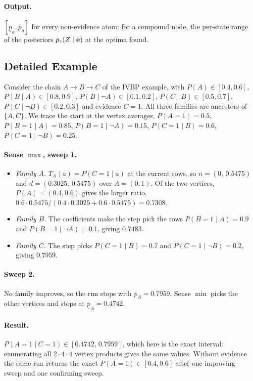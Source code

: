 \documentclass{article} %
\begin{document}
\paragraph{Output.}
$[\underline p_a,\overline p_a]$ for every non-evidence atom; for a compound node,
the per-state range of the posteriors $p_r(Z\mid\mathbf{e})$ at the optima found.

\subsection{Detailed Example}

Consider the chain $A\to B\to C$ of the IVBP example, with $P(A)\in[0.4,0.6]$,
$P(B\mid A)\in[0.8,0.9]$, $P(B\mid\lnot A)\in[0.1,0.2]$, $P(C\mid B)\in[0.5,0.7]$,
$P(C\mid\lnot B)\in[0.2,0.3]$ and evidence $C{=}1$. All three families are ancestors of
$\{A,C\}$. We trace the start at the vertex averages, $P(A{=}1)=0.5$,
$P(B{=}1\mid A)=0.85$, $P(B{=}1\mid\lnot A)=0.15$, $P(C{=}1\mid B)=0.6$,
$P(C{=}1\mid\lnot B)=0.25$.

\paragraph{Sense $\max$, sweep 1.}
\begin{itemize}
  \item \emph{Family $A$.} $T_A(a)=P(C{=}1\mid a)$ at the current rows, so
        $n=(0,\,0.5475)$ and $d=(0.3025,\,0.5475)$ over $A=(0,1)$. Of the two
        vertices, $P(A)=(0.4,0.6)$ gives the larger ratio,
        $0.6\cdot0.5475/(0.4\cdot0.3025+0.6\cdot0.5475)=0.7308$.
  \item \emph{Family $B$.} The coefficients make the step pick the rows
        $P(B{=}1\mid A)=0.9$ and $P(B{=}1\mid\lnot A)=0.1$, giving $0.7483$.
  \item \emph{Family $C$.} The step picks $P(C{=}1\mid B)=0.7$ and
        $P(C{=}1\mid\lnot B)=0.2$, giving $0.7959$.
\end{itemize}

\paragraph{Sweep 2.} No family improves, so the run stops with
$\overline p_A=0.7959$. Sense $\min$ picks the other vertices and stops at
$\underline p_A=0.4742$.

\paragraph{Result.} $P(A{=}1\mid C{=}1)\in[0.4742,\,0.7959]$, which here is the exact
interval: enumerating all $2\cdot4\cdot4$ vertex products gives the same values.
Without evidence the same run returns the exact $P(A{=}1)\in[0.4,0.6]$ after one improving sweep and one confirming sweep.
\end{document}
